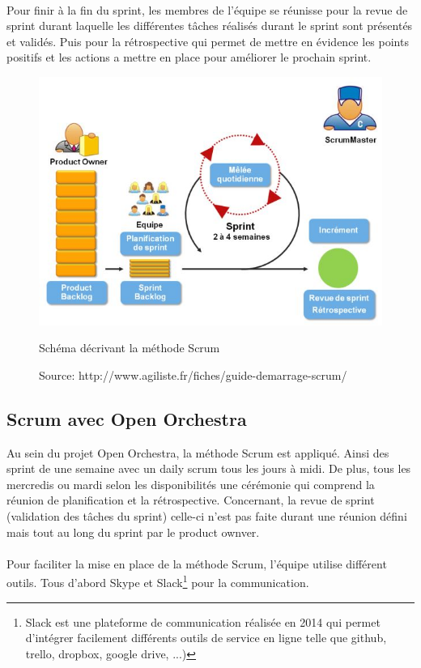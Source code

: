  \paragraph{}
Pour finir à la fin du sprint, les membres de l'équipe se réunisse pour la revue de sprint durant laquelle les différentes tâches réalisés durant le sprint sont présentés et validés. Puis pour la rétrospective qui permet de mettre en évidence les points positifs et les actions a mettre en place pour améliorer le prochain sprint.

\begin{figure}[H]
  \begin{center}
    \includegraphics[scale=0.75]{images/scrum}
  \end{center}
  \caption{Schéma décrivant la méthode Scrum}
  \caption*{Source: http://www.agiliste.fr/fiches/guide-demarrage-scrum/}
  \label{scrum}
\end{figure}

\subsection{Scrum avec Open Orchestra}
Au sein du projet Open Orchestra, la méthode Scrum est appliqué. Ainsi des sprint de une semaine avec un daily scrum tous les jours à midi.
De plus, tous les mercredis ou mardi selon les disponibilités une \og cérémonie \fg{} qui comprend la réunion de planification et la rétrospective.
Concernant, la revue de sprint (validation des tâches du sprint) celle-ci n'est pas faite durant une réunion défini mais tout au long du sprint par le product ownver.
 \paragraph{}
 Pour faciliter la mise en place de la méthode Scrum, l'équipe utilise différent outils.
 Tous d'abord Skype et Slack\footnote{Slack est une plateforme de communication réalisée en 2014 qui permet d'intégrer facilement différents outils de service en ligne telle que github, trello, dropbox, google drive, ...)} pour la communication.
